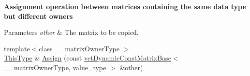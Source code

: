 \begin{Indent}{\bf Assignment operation between matrices containing the same data type but different owners}\par
{\em 
\begin{DoxyParams}{Parameters}
{\em other} & The matrix to be copied. \\
\hline
\end{DoxyParams}
}\begin{DoxyCompactItemize}
\item 
{\footnotesize template$<$class \-\_\-\-\_\-matrix\-Owner\-Type $>$ }\\\hyperlink{classvct_dynamic_const_matrix_base_ac4ff48cbe4d9de3fdef5a02447ffb9db}{This\-Type} \& \hyperlink{classvct_dynamic_matrix_base_a2f080a67dc52e906f0219bbc924febbc}{Assign} (const \hyperlink{classvct_dynamic_const_matrix_base}{vct\-Dynamic\-Const\-Matrix\-Base}$<$ \-\_\-\-\_\-matrix\-Owner\-Type, value\-\_\-type $>$ \&other)
\end{DoxyCompactItemize}
\end{Indent}
